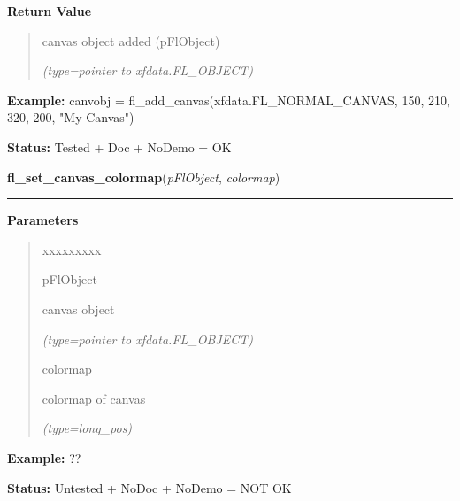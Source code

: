 \begin{boxedminipage}{\funcwidth}
\begin{quote}
      \end{quote}

      \textbf{Return Value}
    \vspace{-1ex}

      \begin{quote}
      canvas object added (pFlObject)

      {\it (type=pointer to xfdata.FL\_OBJECT)}

      \end{quote}

\textbf{Example:} canvobj = fl\_add\_canvas(xfdata.FL\_NORMAL\_CANVAS, 150, 210,         320,
200, "My Canvas")



\textbf{Status:} Tested + Doc + NoDemo = OK



    \end{boxedminipage}

    \label{xformslib:flcanvas:fl_set_canvas_colormap}

    \vspace{0.5ex}

\hspace{.8\funcindent}\begin{boxedminipage}{\funcwidth}

    \raggedright \textbf{fl\_set\_canvas\_colormap}(\textit{pFlObject}, \textit{colormap})

    \vspace{-1.5ex}

    \rule{\textwidth}{0.5\fboxrule}
\setlength{\parskip}{2ex}
\setlength{\parskip}{1ex}
      \textbf{Parameters}
      \vspace{-1ex}

      \begin{quote}
        \begin{Ventry}{xxxxxxxxx}

          \item[pFlObject]

          canvas object

            {\it (type=pointer to xfdata.FL\_OBJECT)}

          \item[colormap]

          colormap of canvas

            {\it (type=long\_pos)}

        \end{Ventry}

      \end{quote}

\textbf{Example:} ??



\textbf{Status:} Untested + NoDoc + NoDemo = NOT OK



    \end{boxedminipage}


